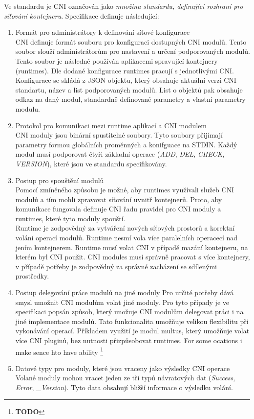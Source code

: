 Ve standardu je CNI označován jako \textit{množina standardu, definující rozhraní pro síťování kontejneru}. Specifikace definuje následující:
\begin{enumerate}
    \item Formát pro administrátory k definování síťové konfigurace \\
    CNI definuje formát souboru pro konfiguraci dostupných CNI modulů. Tento soubor slouží administrátorům pro nastavení a určení podporovaných modulů. Tento soubor je následně používán aplikacemi spravující kontejnery (runtimes). Dle dodané konfigurace runtimes pracují s jednotlivými CNI. \\
    Konfigurace se skládá z JSON objektu, který obsahuje aktuální verzi CNI standartu, název a list podporovaných modulů. List o objektů pak obsahuje odkaz na daný modul, standardně definované parametry a vlastní parametry modulu.
    \item Protokol pro komunikaci mezi runtime aplikací a CNI modulem \\
    CNI moduly jsou binární spustitelné soubory. Tyto soubory přijímají parametry formou globálních proměnných a konifguace na STDIN. Každý modul musí podporovat čtyři základní operace (\textit{ADD}, \textit{DEL}, \textit{CHECK}, \textit{VERSION}), které jsou ve standardu specifikovány.
    \item Postup pro spouštění modulů \\
    Pomocí zmíněného způsobu je možné, aby runtimes využívali služeb CNI modulů a tím mohli zpravovat síťování uvnitř kontejnerů. Proto, aby komunikace fungovala definuje CNI řadu pravidel pro CNI moduly a runtimes, které tyto moduly spouští. \\
    Runtime je zodpovědný za vytváření nových síťových prostorů a korektní volání operací modulů. Runtime nesmí vola více paralelních operacecí nad jením kontejnerem. Runtime musí volat CNI v případě mazání kontejneru, na kterém byl CNI použit.
    CNI modules musí správně pracovat s více kontejnery, v případě potřeby je zodpovědný za správné zacházení se sdílenými prostředky. 
    \item Postup delegování práce modulů na jiné moduly
    Pro určité potřeby dává smysl umožnit CNI modulům volat jiné moduly. Pro tyto případy je ve specifikaci popsán způsob, který unožuje CNI modulům delegovat práci i na jiné implementace modulů. Tato funkcionalita umožňuje velikou flexibilitu při vykonávání operací. Příkladem využití je modul multus, který umožňuje volat více CNI pluginů, bez nutnosti přizpůsobovat runtimes.
    For some ocations i make sence hto have ability \footnote{\textbf{TODO}}
    \item Datové typy pro moduly, které jsou vraceny jako výsledky CNI operace
    Volané moduly mohou vracet jeden ze tří typů návratových dat (\textit{Success}, \textit{Error}, \textit{\_Version}). Tyto data obsahují bližší informace o výsledku volání.  
\end{enumerate}\cite{thekubernetesauthors_2023_container}

